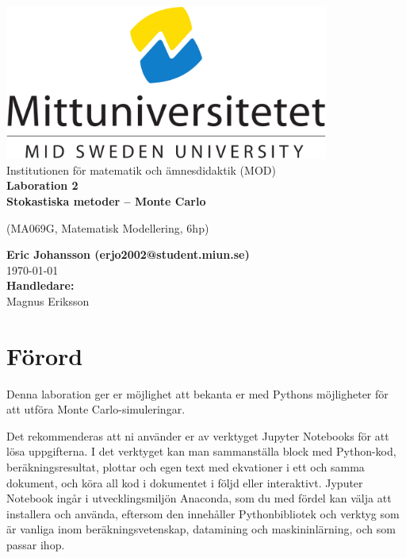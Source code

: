 \documentclass[a4paper]{article}
\makeatletter
\newcommand{\getauthor}{Eric Johansson (erjo2002@student.miun.se)} %
\newcommand{\gettitle}{Laboration 2 \\ Stokastiska metoder -- Monte Carlo} %
\newcommand{\getcourse}{(MA069G, Matematisk Modellering, 6hp)} %
\newcommand{\getsupervisor}{Magnus Eriksson}
\makeatother
\begin{document}
\begin{titlepage}
  \begin{center}
    \vspace*{1cm}
    \includegraphics[width=0.8\textwidth]{msu.png}\\[0.5cm]
    \Large
    Institutionen för matematik och ämnesdidaktik (MOD)\\[1cm]
    \Huge
    \textbf{\gettitle}

    \large
    \getcourse{}

    \vspace{1cm}

    \Large
    \textbf{\getauthor}\\
    \vfill
    \vspace{0.8cm}
    \small
    \today \\
    \Large
    \textbf{Handledare:}\\
    \getsupervisor{}
  \end{center}
\end{titlepage}

\tableofcontents
\newpage

\section{Förord}
Denna laboration ger er möjlighet att bekanta er med Pythons
möjligheter för att utföra Monte Carlo-simuleringar.

Det rekommenderas att ni använder er av verktyget Jupyter Notebooks för att lösa 
uppgifterna. I det verktyget kan man sammanställa block med Python-kod, beräkningsresultat, 
plottar och egen text med ekvationer i ett och samma dokument, och köra all kod i dokumentet 
i följd eller interaktivt. Jyputer Notebook ingår i utvecklingsmiljön Anaconda, som du med 
fördel kan välja att installera och använda, eftersom den innehåller Pythonbibliotek och 
verktyg som är vanliga inom beräkningsvetenskap, datamining och maskininlärning, och som passar ihop.
\end{document}
